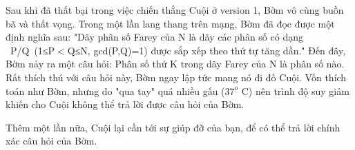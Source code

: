 Sau khi đã thất bại trong việc chiến thắng Cuội ở version 1, Bờm vô cùng buồn bã và thất vọng. Trong một lần lang thang trên mạng, Bờm đã đọc được một định nghĩa sau: "Dãy phân số Farey của N là dãy các phân số có dạng  P/Q (1≤P$<$Q≤N, gcd(P,Q)=1) được sắp xếp theo thứ tự tăng dần." Đến đây, Bờm nảy ra một câu hỏi: Phân số thứ K trong dãy Farey của N là phân số nào.  Rất thích thú với câu hỏi này, Bờm ngay lập tức mang nó đi đố Cuội. Vốn thích toán như Bờm, nhưng do "qua tay" quá nhiều gấu ($37^{o}$   C) nên trình độ suy giảm khiến cho Cuội không thể trả lời được câu hỏi của Bờm.  

   Thêm một lần nữa, Cuội lại cần tới sự giúp đỡ của bạn, để có thể trả lời chính xác câu hỏi của Bờm.